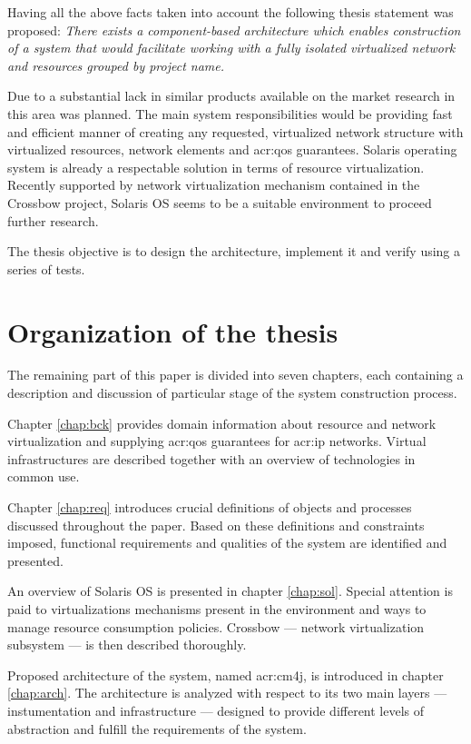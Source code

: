 \documentclass[11pt,openany]{book}
\begin{document}
      Having all the above facts taken into account the following thesis statement was proposed: \textit{There exists a
      component-based architecture which enables construction of a system that would facilitate working with a fully
      isolated virtualized network and resources grouped by project name.}

      Due to a substantial lack in similar products available on the market research in this area was planned. The main system
      responsibilities would be providing fast and efficient manner of creating any requested, virtualized network
      structure with virtualized resources, network elements and \gls{acr:qos} guarantees.  Solaris operating system is
      already a respectable solution in terms of resource virtualization. Recently supported by network virtualization
      mechanism contained in the Crossbow project, Solaris OS seems to be a suitable environment to proceed further
      research.

      The thesis objective is to design the architecture, implement it and verify using a series of tests.


    \section{Organization of the thesis}

      The remaining part of this paper is divided into seven chapters, each containing a description and discussion of
      particular stage of the system construction process.

      Chapter \ref{chap:bck} provides domain information about resource and network virtualization and supplying
      \gls{acr:qos} guarantees for \gls{acr:ip} networks. Virtual infrastructures are described
      together with an overview of technologies in common use.

      Chapter \ref{chap:req} introduces crucial definitions of objects and processes discussed throughout the paper.
      Based on these definitions and constraints imposed, functional requirements and qualities of the system are
      identified and presented.

      An overview of Solaris OS is presented in chapter \ref{chap:sol}. Special attention is paid to virtualizations
      mechanisms present in the environment and ways to manage resource consumption policies. Crossbow --- network
      virtualization subsystem --- is then described thoroughly.

      Proposed architecture of the system, named \gls{acr:cm4j}, is introduced in chapter \ref{chap:arch}. The
      architecture is analyzed with respect to its two main layers --- instumentation and infrastructure --- designed to
      provide different levels of abstraction and fulfill the requirements of the system.
\end{document}
